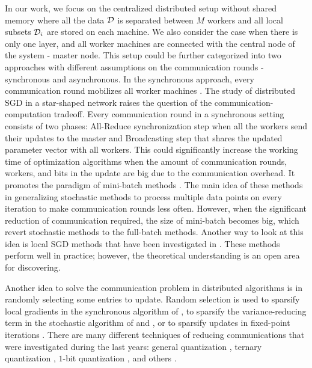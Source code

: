 In our work, we focus on the centralized distributed setup without shared memory \cite{mishchenko2018} where all the data $\mathcal{D}$ is separated between $M$ workers and all local subsets $\mathcal{D}_i$ are stored on each machine. {We also consider the case when there is only one layer, and all worker machines are connected with the central node of the system - master node. }This setup could be further categorized into two approaches with different assumptions on the communication rounds - synchronous and asynchronous. In the synchronous approach, every communication round mobilizes all worker machines \cite{BoydPCPE11,Chen2016,Tsianos12}. The study of distributed SGD in a star-shaped network \cite{yang2013trading} raises the question of the communication-computation tradeoff. {Every communication round in a synchronous setting consists of two phases: All-Reduce synchronization step when all the workers send their updates to the master and Broadcasting step that shares the updated parameter vector with all workers. This could significantly increase the working time of optimization algorithms when the amount of communication rounds, workers, and bits in the update are big due to the communication overhead.} It promotes the paradigm of mini-batch methods \cite{dekel2012optimal, shalev2013accelerated, shamir2014distributed, qu2016coordinate, takavc2015distributed}. The main idea of these methods in generalizing stochastic methods to process multiple data points on every iteration to make communication rounds less often. However, when the significant reduction of communication required, the size of mini-batch becomes big, which revert stochastic methods to the full-batch methods. Another way to look at this idea is local SGD methods that have been investigated in \cite{stich2018local,khaled2019first,khaled2020tighter,li2019federated,ma2017distributed}. These methods perform well in practice; however, the theoretical understanding is an open area for discovering.

Another idea to solve the communication problem in distributed algorithms is in randomly selecting some entries to update. Random selection is used to sparsify local gradients in the synchronous algorithm of \cite{wangni2018gradient}, to sparsify the variance-reducing term in the stochastic algorithm of \cite{leblond2016asaga} and \cite{pedregosa2017breaking}, or to sparsify updates in fixed-point iterations \cite{peng2016arock}. There are many different techniques of reducing communications that were investigated during the last years:  general quantization \cite{alistarh2017qsgd, horvath2019stochastic, koloskova2019decentralized}, ternary quantization \cite{wen2017terngrad}, $1$-bit quantization \cite{bernstein2018signsgd}, and others \cite{ben2019demystifying, lin2017deep}.


